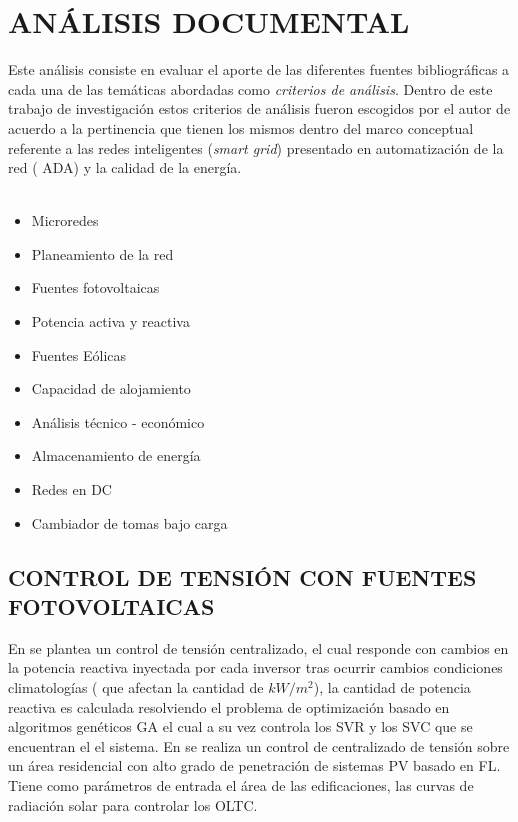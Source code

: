 \documentclass[12pt, letterpaper]{report}
\begin{document}
\chapter{ANÁLISIS DOCUMENTAL}
\label{cap:documental}

Este  análisis  consiste en evaluar el aporte de las diferentes fuentes bibliográficas a cada una de las temáticas abordadas  como \textit{criterios de análisis}. Dentro de este trabajo de investigación estos criterios de análisis fueron escogidos por el autor de acuerdo a la pertinencia que tienen los mismos dentro del marco conceptual referente a las redes inteligentes (\textit{smart grid}) presentado en   automatización de la red ( \ac{ADA}) y la calidad de la energía.\\\\ 

\begin{itemize}
    \item Microredes
    \item Planeamiento de la red
    \item Fuentes fotovoltaicas
    \item Potencia activa y reactiva
    \item Fuentes Eólicas
    \item Capacidad de alojamiento
    \item Análisis técnico - económico
    \item Almacenamiento de energía
    \item Redes en DC
    \item Cambiador de tomas bajo carga
\end{itemize}

\section{CONTROL DE TENSIÓN CON FUENTES FOTOVOLTAICAS}

En \cite{Oshiro2011a} se plantea un control de tensión centralizado,  el cual responde con  cambios en la potencia reactiva inyectada por cada inversor tras  ocurrir cambios condiciones climatologías ( que afectan la cantidad de $kW/m^{2}$), la cantidad de potencia reactiva es calculada resolviendo el problema de optimización  basado en algoritmos genéticos \ac{GA} el cual a su vez controla los \ac{SVR}  y los \ac{SVC} que se encuentran el el sistema. 
En \cite{Shalwala2011a} se realiza un control de centralizado  de tensión sobre un área residencial con alto grado de penetración de sistemas \ac{PV} basado en \ac{FL}. Tiene como parámetros  de entrada el área de las edificaciones, las curvas de radiación solar para controlar los \ac{OLTC}.  
\end{document}
